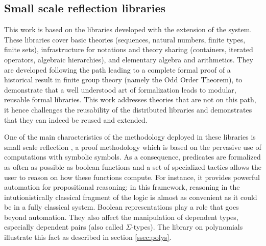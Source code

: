 \documentclass{mscs}
\begin{document}

\subsection{Small scale reflection libraries}
This work is based on the \ssr{} libraries \cite{ssrsite}
developed with the \ssr{} extension
\cite{GONTHIER:2008:INRIA-00258384:4} of the \Coq{} system.
These libraries cover basic theories (sequences, natural
numbers, finite types, finite sets), infrastructure for notations and
theory sharing (containers, iterated operators, algebraic
hierarchies), and elementary algebra and arithmetics. 
They are developed following the path leading to a complete formal
proof of a historical result in finite group theory (namely the Odd Order
Theorem), to demonstrate that a well
understood art of formalization leads to modular, reusable formal
libraries. This work addresses theories that
are not on this path, it hence challenges the reusability of the
distributed libraries and demonstrates that they can indeed be reused
and extended.

One of the main characteristics of the methodology deployed in these
libraries is small scale reflection 
\cite{ssr-tutorial}, a proof methodology which is based on the
pervasive use of computations with symbolic symbols. 
As a consequence, predicates are formalized as often as possible as
boolean functions and a set of specialized tactics
allows the user to reason on how these functions compute.
For instance, it provides powerful automation for propositional
reasoning: in this framework, reasoning in the intutionistically
classical fragment of the \Coq{} logic is almost as convenient as it
could be in a fully classical system.
Boolean representations play a role that goes beyond automation.
They also affect the manipulation of dependent
types, especially dependent pairs (also called
$\Sigma$-types). The \ssr{} library on polynomials
illustrate this fact as described in section \ref{ssec:polys}.
\end{document}
